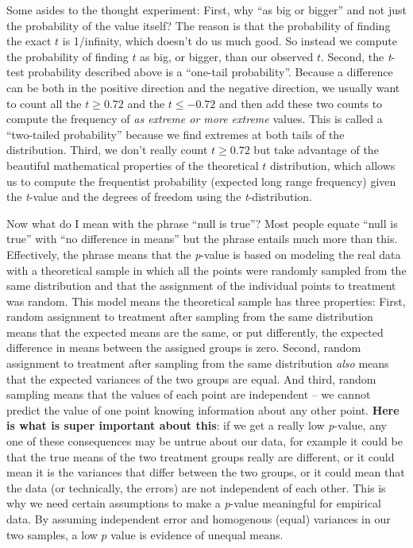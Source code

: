 \documentclass[]{book}
\begin{document}
Some asides to the thought experiment: First, why ``as big or bigger'' and not just the probability of the value itself? The reason is that the probability of finding the exact \(t\) is 1/infinity, which doesn't do us much good. So instead we compute the probability of finding \(t\) as big, or bigger, than our observed \(t\). Second, the \emph{t}-test probability described above is a ``one-tail probability''. Because a difference can be both in the positive direction and the negative direction, we usually want to count all the \(t \ge 0.72\) and the \(t \le -0.72\) and then add these two counts to compute the frequency of \emph{as extreme or more extreme} values. This is called a ``two-tailed probability'' because we find extremes at both tails of the distribution. Third, we don't really count \(t \ge 0.72\) but take advantage of the beautiful mathematical properties of the theoretical \(t\) distribution, which allows us to compute the frequentist probability (expected long range frequency) given the \emph{t}-value and the degrees of freedom using the \emph{t}-distribution.

Now what do I mean with the phrase ``null is true''? Most people equate ``null is true'' with ``no difference in means'' but the phrase entails much more than this. Effectively, the phrase means that the \emph{p}-value is based on modeling the real data with a theoretical sample in which all the points were randomly sampled from the same distribution and that the assignment of the individual points to treatment was random. This model means the theoretical sample has three properties: First, random assignment to treatment after sampling from the same distribution means that the expected means are the same, or put differently, the expected difference in means between the assigned groups is zero. Second, random assignment to treatment after sampling from the same distribution \emph{also} means that the expected variances of the two groups are equal. And third, random sampling means that the values of each point are independent -- we cannot predict the value of one point knowing information about any other point. \textbf{Here is what is super important about this}: if we get a really low \emph{p}-value, any one of these consequences may be untrue about our data, for example it could be that the true means of the two treatment groups really are different, or it could mean it is the variances that differ between the two groups, or it could mean that the data (or technically, the errors) are not independent of each other. This is why we need certain assumptions to make a \emph{p}-value meaningful for empirical data. By assuming independent error and homogenous (equal) variances in our two samples, a low \(p\) value is evidence of unequal means.
\end{document}
